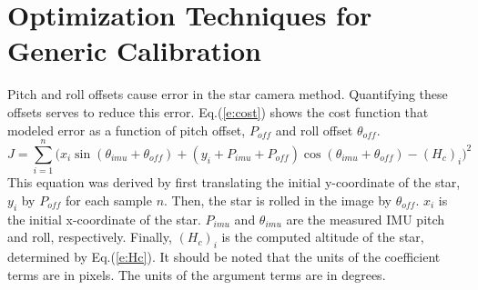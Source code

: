 \documentclass[12pt,a4paper]{book}
\begin{document}
\section{Optimization Techniques for Generic Calibration}
Pitch and roll offsets cause error in the star camera method.  Quantifying these offsets serves to reduce this error.  Eq.(\ref{e:cost}) shows the cost function that modeled error as a function of pitch offset, $P_{off}$ and roll offset $\theta_{off}$.  
\begin{equation}
    \label{e:cost}
J = \sum\limits_{i=1}^n  \Big(x_{i}\sin(\theta_{imu} + \theta_{off}) + (y_{i} + P_{imu} + P_{off})\cos(\theta_{imu} + \theta_{off})-(H_{c})_{i}\Big)^{2}
\end{equation}
This equation was derived by first translating the initial y-coordinate of the star, $y_{i}$ by $P_{off}$ for each sample $n$.  Then, the star is rolled in the image by $\theta_{off}$. $x_{i}$ is the initial x-coordinate of the star.  $P_{imu}$ and $\theta_{imu}$ are the measured IMU pitch and roll, respectively.  Finally, $(H_{c})_{i}$ is the computed altitude of the star, determined by Eq.(\ref{e:Hc}).   It should be noted that the units of the coefficient terms are in pixels.  The units of the argument terms are in degrees.
\end{document}
